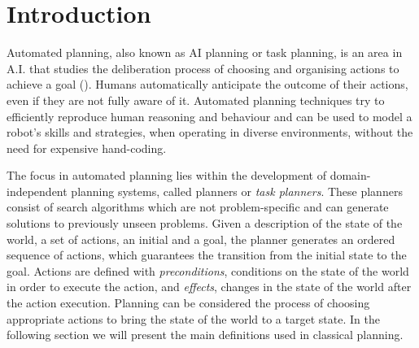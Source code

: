 \section{Introduction}


Automated planning, also known as AI planning or task planning, is an area in A.I. that studies the deliberation process of choosing and organising actions to achieve a goal (\cite{ghallab2004automated}). 
Humans automatically anticipate the outcome of their actions, even if they are not fully aware of it. 
Automated planning techniques try to %
 efficiently reproduce human reasoning and behaviour and can be used to model a robot's skills and strategies, when operating in diverse environments, without the need for expensive hand-coding.

The focus in automated planning lies within the development of {domain-independent} planning systems, called planners or \textit{task planners}.
These planners consist of search algorithms which are not problem-specific and can generate solutions to previously unseen problems. 
Given a description of the state of the world,  a set of actions, an initial and a goal, the planner generates an ordered sequence of actions, which guarantees the transition from the initial state to the goal. 
Actions are defined with \textit{preconditions}, \ie conditions on the state of the world in order to execute the action, and \textit{effects}, \ie changes in the state of the world after the action execution.
Planning can be considered the process of choosing appropriate actions to bring the state of the world to a target state.
In the following section we will present the main definitions used in classical planning.

